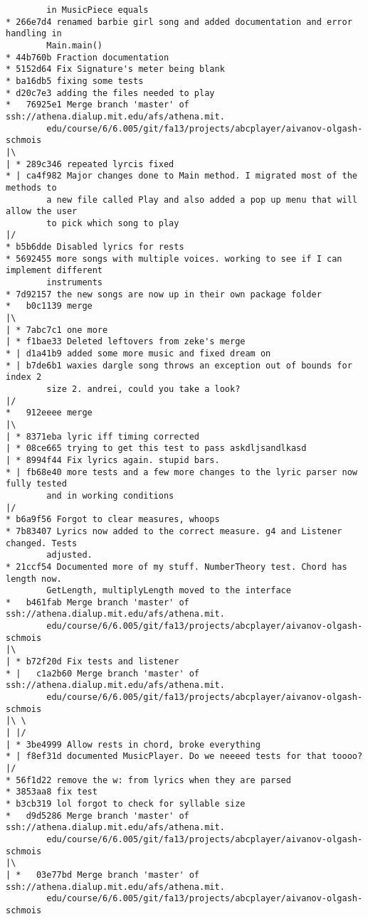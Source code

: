 \documentclass[12pt]{book}
\begin{document}
\begin{Verbatim}
        in MusicPiece equals
* 266e7d4 renamed barbie girl song and added documentation and error handling in 
        Main.main()
* 44b760b Fraction documentation
* 5152d64 Fix Signature's meter being blank
* ba16db5 fixing some tests
* d20c7e3 adding the files needed to play
*   76925e1 Merge branch 'master' of ssh://athena.dialup.mit.edu/afs/athena.mit.
        edu/course/6/6.005/git/fa13/projects/abcplayer/aivanov-olgash-schmois
|\
| * 289c346 repeated lyrcis fixed
* | ca4f982 Major changes done to Main method. I migrated most of the methods to 
        a new file called Play and also added a pop up menu that will allow the user 
        to pick which song to play
|/
* b5b6dde Disabled lyrics for rests
* 5692455 more songs with multiple voices. working to see if I can implement different 
        instruments
* 7d92157 the new songs are now up in their own package folder
*   b0c1139 merge
|\
| * 7abc7c1 one more
| * f1bae33 Deleted leftovers from zeke's merge
* | d1a41b9 added some more music and fixed dream on
* | b7de6b1 waxies dargle song throws an exception out of bounds for index 2 
        size 2. andrei, could you take a look?
|/
*   912eeee merge
|\
| * 8371eba lyric iff timing corrected
| * 08ce665 trying to get this test to pass askdljsandlkasd
| * 8994f44 Fix lyrics again. stupid bars.
* | fb68e40 more tests and a few more changes to the lyric parser now fully tested 
        and in working conditions
|/
* b6a9f56 Forgot to clear measures, whoops
* 7b83407 Lyrics now added to the correct measure. g4 and Listener changed. Tests 
        adjusted.
* 21ccf54 Documented more of my stuff. NumberTheory test. Chord has length now. 
        GetLength, multiplyLength moved to the interface
*   b461fab Merge branch 'master' of ssh://athena.dialup.mit.edu/afs/athena.mit.
        edu/course/6/6.005/git/fa13/projects/abcplayer/aivanov-olgash-schmois
|\
| * b72f20d Fix tests and listener
* |   c1a2b60 Merge branch 'master' of ssh://athena.dialup.mit.edu/afs/athena.mit.
        edu/course/6/6.005/git/fa13/projects/abcplayer/aivanov-olgash-schmois
|\ \
| |/
| * 3be4999 Allow rests in chord, broke everything
* | f8ef31d documented MusicPlayer. Do we neeeed tests for that toooo?
|/
* 56f1d22 remove the w: from lyrics when they are parsed
* 3853aa8 fix test
* b3cb319 lol forgot to check for syllable size
*   d9d5286 Merge branch 'master' of ssh://athena.dialup.mit.edu/afs/athena.mit.
        edu/course/6/6.005/git/fa13/projects/abcplayer/aivanov-olgash-schmois
|\
| *   03e77bd Merge branch 'master' of ssh://athena.dialup.mit.edu/afs/athena.mit.
        edu/course/6/6.005/git/fa13/projects/abcplayer/aivanov-olgash-schmois

\end{Verbatim}
\end{document}

